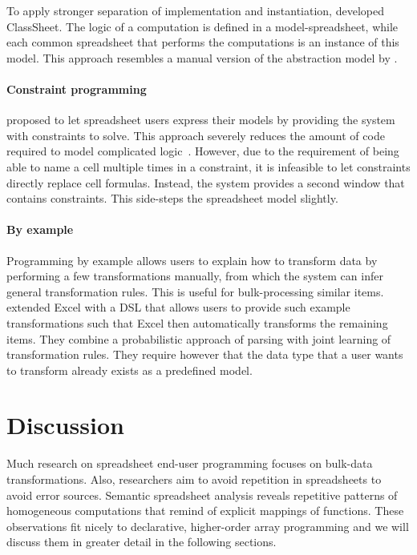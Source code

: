 \documentclass[a4paper]{article}
\begin{document}
To apply stronger separation of implementation and instantiation, \citet{6070409} developed ClassSheet. The logic of a computation is defined in a model-spreadsheet, while each common spreadsheet that performs the computations is an instance of this model. This approach resembles a manual version of the abstraction model by \citet{Isakowitz:1995:TLT:195705.195708}.

\paragraph{Constraint programming}

\citet{Stadelmann:1993:SBC:168642.168664} proposed to let spreadsheet users express their models by providing the system with constraints to solve. This approach severely reduces the amount of code required to model complicated logic~\cite{Stadelmann:1993:SBC:168642.168664}. However, due to the requirement of being able to name a cell multiple times in a constraint, it is infeasible to let constraints directly replace cell formulas. Instead, the system provides a second window that contains constraints. This side-steps the spreadsheet model slightly.

\paragraph{By example}

Programming by example allows users to explain how to transform data by performing a few transformations manually, from which the system can infer general transformation rules. This is useful for bulk-processing similar items. \citet{Singh:2016:TSD:2837614.2837668} extended Excel with a DSL that allows users to provide such example transformations such that Excel then automatically transforms the remaining items. They combine a probabilistic approach of parsing with joint learning of transformation rules. They require however that the data type that a user wants to transform already exists as a predefined model.

\section{Discussion}
\label{sec:discussion}

Much research on spreadsheet end-user programming focuses on bulk-data transformations. Also, researchers aim to avoid repetition in spreadsheets to avoid error sources. Semantic spreadsheet analysis reveals repetitive patterns of homogeneous computations that remind of explicit mappings of functions. These observations fit nicely to declarative, higher-order array programming and we will discuss them in greater detail in the following sections.
\end{document}
